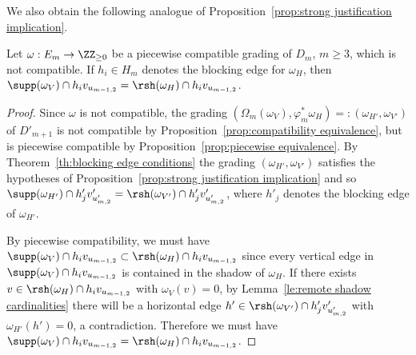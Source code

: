 We also obtain the following analogue of Proposition~\ref{prop:strong justification implication}.
\begin{corollary}
 \label{cor:support and remote shadow}
 Let $\omega:E_m\to\ZZ_{\ge0}$ be a piecewise compatible grading of $D_m$, $m\ge3$, which is not compatible.
 If $h_i\in H_m$ denotes the blocking edge for $\omega_H$, then $\supp(\omega_V)\cap h_iv_{u_{m-1,2}}=\rsh(\omega_H)\cap h_iv_{u_{m-1,2}}$.
\end{corollary}
\begin{proof}
 Since $\omega$ is not compatible, the grading $(\Omega_m(\omega_V),\varphi^*_m\omega_H)=:(\omega_{H'},\omega_{V'})$ of $D'_{m+1}$ is not compatible by Proposition~\ref{prop:compatibility equivalence}, but is piecewise compatible by Proposition~\ref{prop:piecewise equivalence}.
 By Theorem~\ref{th:blocking edge conditions} the grading $(\omega_{H'},\omega_{V'})$ satisfies the hypotheses of Proposition~\ref{prop:strong justification implication} and so $\supp(\omega_{H'})\cap h'_jv'_{u'_{m,2}}=\rsh(\omega_{V'})\cap h'_jv'_{u'_{m,2}}$, where $h'_j$ denotes the blocking edge of $\omega_{H'}$.

 By piecewise compatibility, we must have $\supp(\omega_V)\cap h_iv_{u_{m-1,2}}\subset\rsh(\omega_H)\cap h_iv_{u_{m-1,2}}$ since every vertical edge in $\supp(\omega_V)\cap h_iv_{u_{m-1,2}}$ is contained in the shadow of $\omega_H$.
 If there exists $v\in\rsh(\omega_H)\cap h_iv_{u_{m-1,2}}$ with $\omega_V(v)=0$, by Lemma~\ref{le:remote shadow cardinalities} there will be a horizontal edge $h'\in\rsh(\omega_{V'})\cap h'_jv'_{u'_{m,2}}$ with $\omega_{H'}(h')=0$, a contradiction.
 Therefore we must have $\supp(\omega_V)\cap h_iv_{u_{m-1,2}}=\rsh(\omega_H)\cap h_iv_{u_{m-1,2}}$.
\end{proof}

